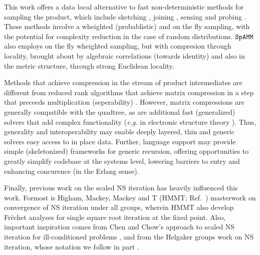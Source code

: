 \documentclass[letterpaper,twocolumn,amsmath,amsfont,amssymb,english,aps,jcp,preprintnumbers,groupaddress,nofootinbib,tightenlines,floatfix]{revtex4}
\newcommand{\mat}[1]{\boldsymbol{#1}}
\newcommand{\ot}{  {\scriptstyle \otimes}_{ \tau } }
\theoremstyle{plain}
\theoremstyle{remark}
\theoremstyle{plain}
\begin{document}
This work offers a data local alternative to fast non-deterministic methods for sampling the product, 
which include sketching \cite{Sarlos2006,Drineas2006,Mahoney2012,Pagh2013,Sivertsen2014,Woodruff2015},
joining \cite{Mishra92,Hoel94,Jacox03,Chen07,Amossen09,Lieberman08,Kim09}, 
sensing \cite{} and probing \cite{}.  These  methods involve a wheighted (probablistic) 
and on the fly sampling, with the potential for complexity reduction in the case of random distributions. 
$\tt SpAMM$ also employs on the fly wheighted sampling,  but with 
compresion through locality, brought about by algebraic correlations (towards identity) and also in the
metric structure, through strong Euclidean locality.

Methods that achieve compression in the stream of product intermediates are different from reduced rank algorithms that achieve 
matrix compression in a step that preceeds multiplication (seperability)  \cite{}.   However, matrix compressions are 
generally compatible with the quadtree, as are additional fast (generalized) solvers that add complex functionality ({\em e.g.} 
in electronic structure theory \cite{}).  Thus, generality 
and interoperability may enable deeply layered, thin and generic solvers easy access to in place data. 
Further, language support may provide simple (skeletonized) frameworks for generic recursion, 
offering opportunities to greatly simplify codebase at the systems level, 
lowering barriers to entry and enhancing concurence (in the Erlang sense). 


Finally, previous work on the scaled NS iteration has heavily influenced this work.  Formost is 
Higham, Mackey, Mackey and T (HMMT; Ref.~\cite{}) masterwork on convergence of NS iteration under all groups,
wherein HMMT also develop Fr\"{e}chet analyses for single square root iteration at the fixed point.
Also, important inspiration comes from Chen and Chow's \cite{} approach to scaled NS iteration for ill-conditioned problems \cite{}, 
and from the Helgaker groups work on NS iteration, whose notation we follow in part \cite{}.  

\end{document}
